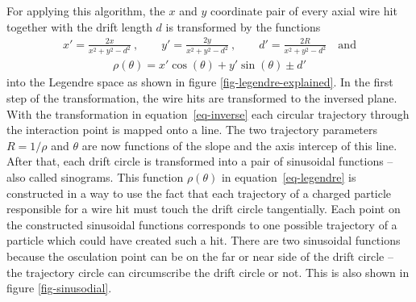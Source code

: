 For applying this algorithm, the $x$ and $y$ coordinate pair of every axial wire hit together with the drift length $d$ is transformed by the functions
\begin{align} x' = \frac{2x}{x^2 + y^2 - d^2}\ , \qquad y' = \frac{2y}{x^2 + y^2 - d^2}\ ,  \qquad d' = \frac{2R}{x^2 + y^2 - d^2}\quad \text{and} \label{eq-inverse} \end{align}
\begin{align}\rho(\theta) = x' \cos(\theta) + y' \sin(\theta) \pm d' \label{eq-legendre}\end{align}
into the Legendre space as shown in figure \ref{fig-legendre-explained}. In the first step of the transformation, the wire hits are transformed to the inversed plane. With the transformation in equation~\ref{eq-inverse} each circular trajectory through the interaction point is mapped onto a line. The two trajectory parameters $R = 1/\rho$ and $\theta$ are now functions of the slope and the axis intercep of this line. After that, each drift circle is transformed into a pair of sinusoidal functions -- also called sinograms. This function $\rho(\theta)$ in equation~\ref{eq-legendre} is constructed in a way to use the fact that each trajectory of a charged particle responsible for a wire hit must touch the drift circle tangentially. Each point on the constructed sinusoidal functions corresponds to one possible trajectory of a particle which could have created such a hit. There are two sinusoidal functions because the osculation point can be on the far or near side of the drift circle -- the trajectory circle can circumscribe the drift circle or not. This is also shown in figure \ref{fig-sinusodial}.

